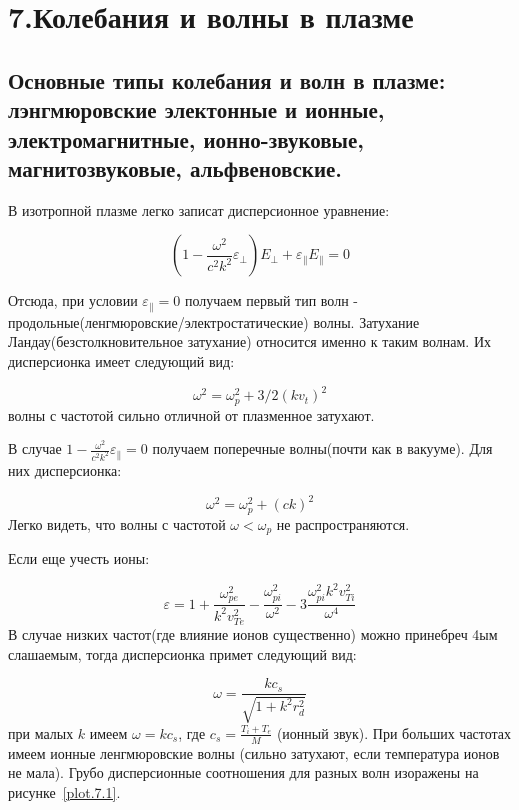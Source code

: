 \documentclass[10pt, a4paper]{article}
\begin{document}
\section{ 7.Колебания и волны в плазме}
\label{sec.7}

\subsection{Основные типы колебания и волн в плазме: лэнгмюровские электонные и ионные, электромагнитные, ионно-звуковые, магнитозвуковые, альфвеновские.}
\label{sec.7.1}

В изотропной плазме легко записат дисперсионное уравнение:

\begin{equation}
    \label{eq.7.1}
    \left(1-\frac{\omega^2}{c^2 k^2} \varepsilon_{\perp}\right) E_{\perp} + \varepsilon_{\parallel} E_{\parallel}= 0
\end{equation}

Отсюда, при условии $\varepsilon_{\parallel} = 0$ получаем первый тип волн - продольные(ленгмюровские/электростатические) 
волны. Затухание Ландау(безстолкновительное затухание) относится именно к таким волнам. Их дисперсионка имеет следующий
вид:

\begin{equation}
    \label{eq.7.2}
    \omega^2=\omega_p^2 + 3/2 (k v_{t})^2
\end{equation}
волны с частотой сильно отличной от плазменное затухают.

В случае $1 - \frac{\omega^2}{c^2 k^2} \varepsilon_{\parallel}=0$ получаем поперечные волны(почти как в вакууме). Для них
дисперсионка:

\begin{equation}
    \label{eq.7.3}
    \omega^2=\omega_p^2 + (c k)^2
\end{equation}
Легко видеть, что волны с частотой $\omega < \omega_p$ не распространяются.

Если еще учесть ионы:

\begin{equation}
    \label{eq.7.4}
    \varepsilon=1+\frac{\omega_{pe}^2}{k^2 v_{Te}^2} - \frac{\omega_{pi}^2}{\omega^2}-3\frac{\omega_{pi}^2 k^2 v_{Ti}^2}{\omega^4}
\end{equation}
В случае низких частот(где влияние ионов существенно) можно принебреч 4ым слашаемым, тогда дисперсионка примет следующий вид:

\begin{equation}
    \label{eq.7.5}
    \omega=\frac{k c_s}{\sqrt{1 + k^2 r_d^2}}
\end{equation}
при малых $k$ имеем $\omega=k c_s$, где $c_s=\frac{T_i + T_e}{M}$ (ионный звук). При больших частотах имеем ионные ленгмюровские волны (сильно затухают, если температура ионов не мала). Грубо дисперсионные соотношения для разных волн изоражены на рисунке~\ref{plot.7.1}.
\end{document}
